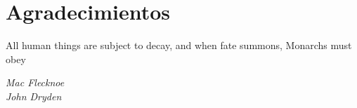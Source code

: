 \chapter*{Agradecimientos}

\epigraph{All human things are subject to decay, and when fate summons, Monarchs must obey}{\textit{Mac Flecknoe \\ John Dryden}}

\lipsum

\newpage
